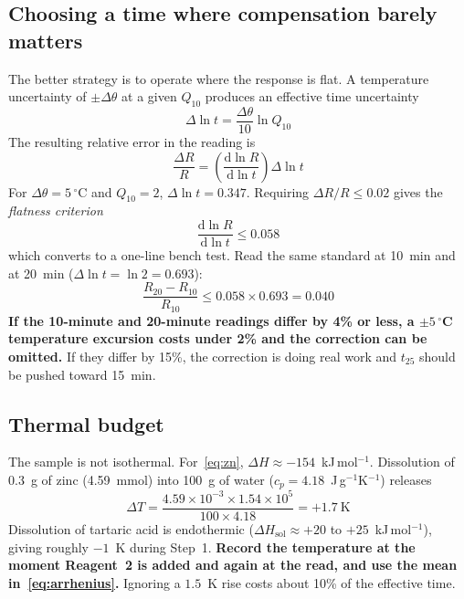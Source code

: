 \documentclass[11pt,a4paper]{article}
\begin{document}
\subsection{Choosing a time where compensation barely matters}

The better strategy is to operate where the response is flat. A temperature
uncertainty of $\pm\Delta\theta$ at a given $Q_{10}$ produces an effective
time uncertainty
\begin{equation}
  \Delta\ln t = \frac{\Delta\theta}{10}\ln Q_{10}
\end{equation}
The resulting relative error in the reading is
\begin{equation}
  \frac{\Delta R}{R} = \left(\frac{\mathrm{d}\ln R}{\mathrm{d}\ln t}\right)
  \Delta \ln t
\end{equation}
For $\Delta\theta = 5\,^\circ$C and $Q_{10} = 2$,
$\Delta\ln t = 0.347$. Requiring $\Delta R/R \leq 0.02$ gives the
\emph{flatness criterion}
\begin{equation}
  \boxed{\;\frac{\mathrm{d}\ln R}{\mathrm{d}\ln t} \leq 0.058\;}
\end{equation}
which converts to a one-line bench test. Read the same standard at 10~min
and at 20~min ($\Delta\ln t = \ln 2 = 0.693$):
\begin{equation}
  \frac{R_{20} - R_{10}}{R_{10}} \leq 0.058 \times 0.693 = 0.040
\end{equation}
\textbf{If the 10-minute and 20-minute readings differ by 4\% or less, a
$\pm 5\,^\circ$C temperature excursion costs under 2\% and the correction
can be omitted.} If they differ by 15\%, the correction is doing real work
and $t_{25}$ should be pushed toward 15~min.

\subsection{Thermal budget}

The sample is not isothermal. For~\eqref{eq:zn},
$\Delta H \approx -154$~kJ\,mol$^{-1}$. Dissolution of 0.3~g of zinc
(4.59~mmol) into 100~g of water ($c_p = 4.18$~J\,g$^{-1}$K$^{-1}$) releases
\begin{equation}
  \Delta T = \frac{4.59\times10^{-3}\times 1.54\times10^{5}}
  {100 \times 4.18} = +1.7\ \mathrm{K}
\end{equation}
Dissolution of tartaric acid is endothermic
($\Delta H_{\mathrm{sol}} \approx +20$ to $+25$~kJ\,mol$^{-1}$), giving
roughly $-1$~K during Step~1. \textbf{Record the temperature at the moment
Reagent~2 is added and again at the read, and use the mean
in~\eqref{eq:arrhenius}.} Ignoring a $1.5$~K rise costs about 10\% of the
effective time.
\end{document}
